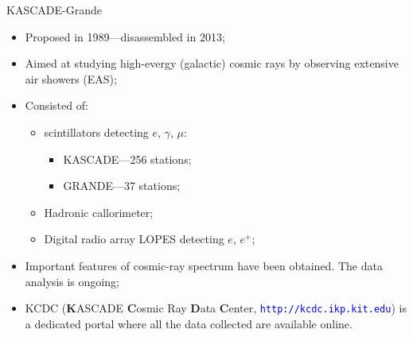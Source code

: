 \begin{frame}{KASCADE-Grande}
\begin{itemize}
  \item Proposed in 1989---disassembled in 2013;
  \item Aimed at studying
  high-evergy (galactic) cosmic rays by observing extensive air showers (EAS);
  \item Consisted of:
  \begin{itemize}
    \item scintillators detecting $e$, $\gamma$, $\mu$:
    \begin{itemize}
    \item KASCADE---256 stations;
    \item GRANDE---37 stations;
    \end{itemize}
    \item Hadronic callorimeter;
    \item Digital radio array LOPES detecting $e$, $e^{+}$;
  \end{itemize}
  \item Important features of cosmic-ray spectrum have been obtained. The data analysis is ongoing;
  \item KCDC (\textbf{K}ASCADE \textbf{C}osmic Ray \textbf{D}ata \textbf{C}enter, \textcolor{blue}{\texttt{http://kcdc.ikp.kit.edu}}) is a dedicated portal where all the data collected are available online. %
\end{itemize}

\end{frame}

